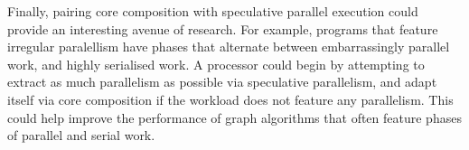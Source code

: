 Finally, pairing core composition with speculative parallel execution could provide an interesting avenue of research.
For example, programs that feature irregular paralellism have phases that alternate between embarrassingly parallel work, and highly serialised work.
A processor could begin by attempting to extract as much parallelism as possible via speculative parallelism, and adapt itself via core composition if the workload does not feature any parallelism.
This could help improve the performance of graph algorithms that often feature phases of parallel and serial work.

